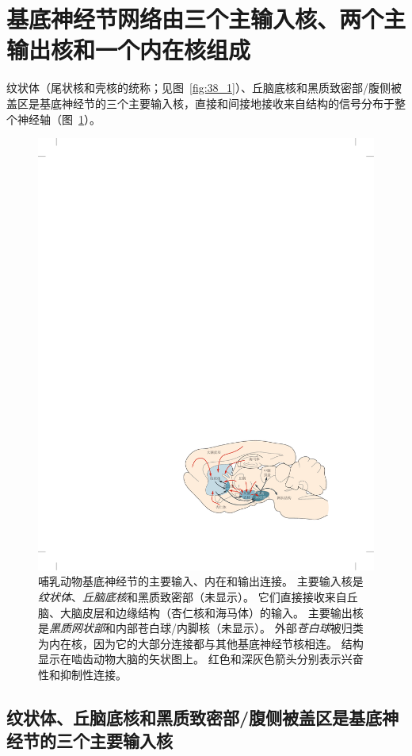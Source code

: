 \section{基底神经节网络由三个主输入核、两个主输出核和一个内在核组成}

纹状体（尾状核和壳核的统称；见图~\ref{fig:38_1}）、丘脑底核和黑质致密部/腹侧被盖区是基底神经节的三个主要输入核，直接和间接地接收来自结构的信号分布于整个神经轴（图~\ref{fig:38_2}）。


\begin{figure}[htbp]
	\centering
	\includegraphics[width=0.78\linewidth]{chap38/fig_38_2}
	\caption{哺乳动物基底神经节的主要输入、内在和输出连接。
		主要输入核是\textit{纹状体}、\textit{丘脑底核}和黑质致密部（未显示）。
		它们直接接收来自丘脑、大脑皮层和边缘结构（杏仁核和海马体）的输入。
		主要输出核是\textit{黑质网状部}和内部苍白球/内脚核（未显示）。
		外部\textit{苍白球}被归类为内在核，因为它的大部分连接都与其他基底神经节核相连。
		结构显示在啮齿动物大脑的矢状图上。
		红色和深灰色箭头分别表示兴奋性和抑制性连接。}
	\label{fig:38_2}
\end{figure}



\subsection{纹状体、丘脑底核和黑质致密部/腹侧被盖区是基底神经节的三个主要输入核}

